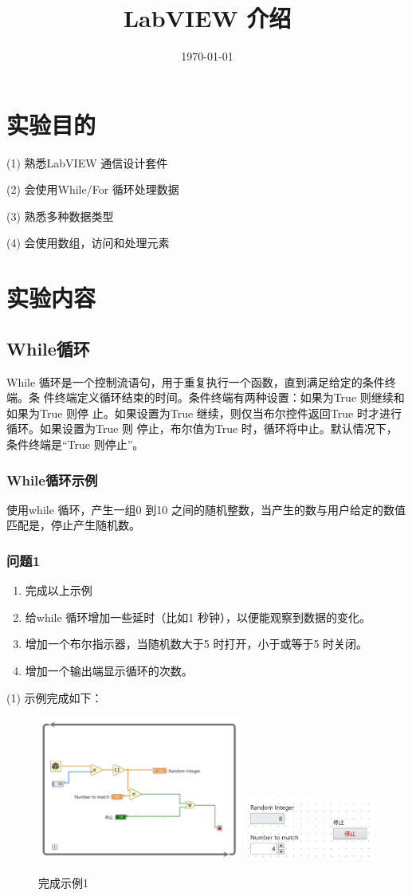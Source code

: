 \documentclass{../source/Experiment}
\title{LabVIEW 介绍}
\date{\today}
\begin{document}
\makecover
\makeheader
\section{实验目的}
 (1) 熟悉LabVIEW 通信设计套件

(2) 会使用While/For 循环处理数据

(3) 熟悉多种数据类型

(4) 会使用数组，访问和处理元素

\section{实验内容}
\subsection{While循环}
While 循环是一个控制流语句，用于重复执行一个函数，直到满足给定的条件终端。条
件终端定义循环结束的时间。条件终端有两种设置：如果为True 则继续和如果为True 则停
止。如果设置为True 继续，则仅当布尔控件返回True 时才进行循环。如果设置为True 则
停止，布尔值为True 时，循环将中止。默认情况下，条件终端是“True 则停止”。
\subsubsection{While循环示例}
使用while 循环，产生一组0 到10 之间的随机整数，当产生的数与用户给定的数值匹配是，停止产生随机数。
\subsubsection{问题1}
\begin{enumerate}
    \item 完成以上示例
    \item 给while 循环增加一些延时（比如1 秒钟），以便能观察到数据的变化。
    \item 增加一个布尔指示器，当随机数大于5 时打开，小于或等于5 时关闭。
    \item 增加一个输出端显示循环的次数。
\end{enumerate}

(1) 示例完成如下：

\begin{figure}[H]
    \centering
    \includegraphics[width = 0.6\textwidth]{lab8/lab1-a.jpg}
    \includegraphics[width = 0.38\textwidth]{lab8/lab1-b.jpg}
    \caption{完成示例1}
\end{figure}
\end{document}
